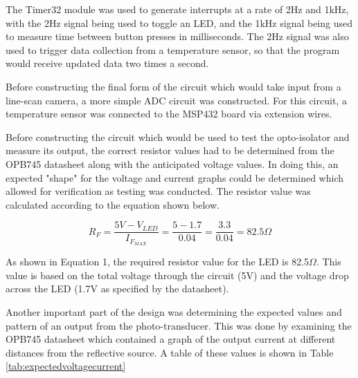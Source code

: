 \documentclass[conference]{IEEEtran}
\begin{document}
The Timer32 module was used to generate interrupts at a rate of 2Hz and
1kHz, with the 2Hz signal being used to toggle an LED, and the 1kHz signal
being used to measure time between button presses in milliseconds. The 2Hz
signal was also used to trigger data collection from a temperature sensor,
so that the program would receive updated data two times a second.


Before constructing the final form of the circuit which would take input from a line-scan camera, a more simple ADC circuit was constructed. For this circuit, a temperature sensor was connected to the MSP432 board via extension wires.

Before constructing the circuit which would be used to test the opto-isolator and measure its output, the correct resistor values
had to be determined from the OPB745 datasheet along with the anticipated voltage values. In doing this, an expected "shape" for the
voltage and current graphs could be determined which allowed for verification as testing was conducted. The resistor value was
calculated according to the equation shown below.

\begin{equation}
    R_F=\frac{5V-V_{LED}}{I_{F_{MAX}}}=\frac{5-1.7}{0.04}=\frac{3.3}{0.04}=82.5\Omega
\end{equation}

As shown in Equation 1, the required resistor value for the LED is 82.5$\Omega$. This value is based on the total voltage through the
circuit (5V) and the voltage drop across the LED (1.7V as specified by the datasheet).

Another important part of the design was determining the expected values and pattern of an output from the photo-transducer. This was
done by examining the OPB745 datasheet which contained a graph of the output current at different distances from the reflective source.
A table of these values is shown in Table \ref{tab:expectedvoltagecurrent}
\end{document}
